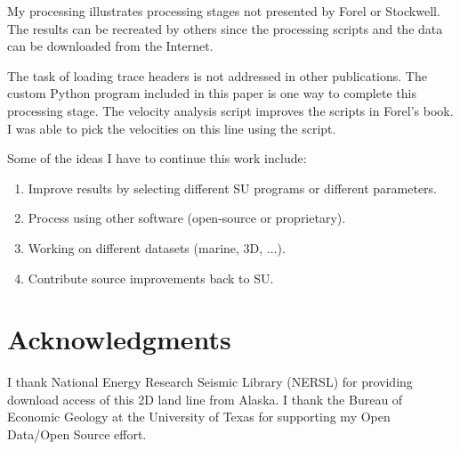 My processing illustrates processing stages not presented by Forel
or Stockwell. The results can be recreated by others since the processing
scripts and the data can be downloaded from the Internet.

The task of loading trace headers is not addressed in other
publications.  The custom Python program included in this paper is one
way to complete this processing stage.  The velocity analysis script 
improves the scripts in Forel's book.  I was able to pick the velocities 
on this line using the script.

Some of the ideas I have to continue this work include:
\begin{enumerate}
\item Improve results by selecting different SU programs or different 
parameters. 
\item Process using other software (open-source or proprietary).
\item Working on different datasets (marine, 3D, ...).
\item Contribute source improvements back to SU.
\end{enumerate}

\section{Acknowledgments}
I thank National Energy Research Seismic Library (NERSL) for providing 
download access of this 2D land line from Alaska.  I thank the Bureau 
of Economic Geology at the University of Texas for supporting my 
Open Data/Open Source effort.
 



